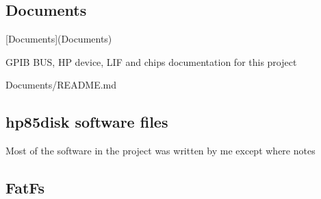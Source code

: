 \subsection*{Documents}


\begin{DoxyItemize}
\item \mbox{[}Documents\mbox{]}(Documents)
\item G\+P\+IB B\+US, HP device, L\+IF and chips documentation for this project
\begin{DoxyItemize}
\item Documents/\+R\+E\+A\+D\+ME.md
\end{DoxyItemize}
\end{DoxyItemize}

\subsection*{hp85disk software files}


\begin{DoxyItemize}
\item Most of the software in the project was written by me except where notes
\end{DoxyItemize}

\subsection*{Fat\+Fs}


